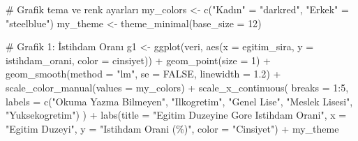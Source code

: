 \documentclass[
  11pt,
  a4paper,
  DIV=11,
  numbers=noendperiod]{scrartcl}
\newenvironment{Shaded}{\begin{snugshade}}{\end{snugshade}}
\newcommand{\AttributeTok}[1]{\textcolor[rgb]{0.40,0.45,0.13}{#1}}
\newcommand{\CommentTok}[1]{\textcolor[rgb]{0.37,0.37,0.37}{#1}}
\newcommand{\ConstantTok}[1]{\textcolor[rgb]{0.56,0.35,0.01}{#1}}
\newcommand{\DecValTok}[1]{\textcolor[rgb]{0.68,0.00,0.00}{#1}}
\newcommand{\FloatTok}[1]{\textcolor[rgb]{0.68,0.00,0.00}{#1}}
\newcommand{\FunctionTok}[1]{\textcolor[rgb]{0.28,0.35,0.67}{#1}}
\newcommand{\NormalTok}[1]{\textcolor[rgb]{0.00,0.23,0.31}{#1}}
\newcommand{\OtherTok}[1]{\textcolor[rgb]{0.00,0.23,0.31}{#1}}
\newcommand{\SpecialCharTok}[1]{\textcolor[rgb]{0.37,0.37,0.37}{#1}}
\newcommand{\StringTok}[1]{\textcolor[rgb]{0.13,0.47,0.30}{#1}}
\begin{document}
\begin{Shaded}
\begin{Highlighting}[]
\CommentTok{\# Grafik tema ve renk ayarları}
\NormalTok{my\_colors }\OtherTok{\textless{}{-}} \FunctionTok{c}\NormalTok{(}\StringTok{"Kadın"} \OtherTok{=} \StringTok{"darkred"}\NormalTok{, }\StringTok{"Erkek"} \OtherTok{=} \StringTok{"steelblue"}\NormalTok{)}
\NormalTok{my\_theme }\OtherTok{\textless{}{-}} \FunctionTok{theme\_minimal}\NormalTok{(}\AttributeTok{base\_size =} \DecValTok{12}\NormalTok{)}

\CommentTok{\# Grafik 1: İstihdam Oranı}
\NormalTok{g1 }\OtherTok{\textless{}{-}} \FunctionTok{ggplot}\NormalTok{(veri, }\FunctionTok{aes}\NormalTok{(}\AttributeTok{x =}\NormalTok{ egitim\_sira, }\AttributeTok{y =}\NormalTok{ istihdam\_orani, }\AttributeTok{color =}\NormalTok{ cinsiyet)) }\SpecialCharTok{+}
  \FunctionTok{geom\_point}\NormalTok{(}\AttributeTok{size =} \DecValTok{1}\NormalTok{) }\SpecialCharTok{+}
  \FunctionTok{geom\_smooth}\NormalTok{(}\AttributeTok{method =} \StringTok{"lm"}\NormalTok{, }\AttributeTok{se =} \ConstantTok{FALSE}\NormalTok{, }\AttributeTok{linewidth =} \FloatTok{1.2}\NormalTok{) }\SpecialCharTok{+}
  \FunctionTok{scale\_color\_manual}\NormalTok{(}\AttributeTok{values =}\NormalTok{ my\_colors) }\SpecialCharTok{+}
  \FunctionTok{scale\_x\_continuous}\NormalTok{(}
    \AttributeTok{breaks =} \DecValTok{1}\SpecialCharTok{:}\DecValTok{5}\NormalTok{,}
    \AttributeTok{labels =} \FunctionTok{c}\NormalTok{(}\StringTok{"Okuma Yazma Bilmeyen"}\NormalTok{, }\StringTok{"Ilkogretim"}\NormalTok{, }\StringTok{"Genel Lise"}\NormalTok{, }\StringTok{"Meslek Lisesi"}\NormalTok{, }\StringTok{"Yuksekogretim"}\NormalTok{)}
\NormalTok{  ) }\SpecialCharTok{+}
  \FunctionTok{labs}\NormalTok{(}\AttributeTok{title =} \StringTok{"Egitim Duzeyine Gore Istihdam Orani"}\NormalTok{,}
       \AttributeTok{x =} \StringTok{"Egitim Duzeyi"}\NormalTok{, }\AttributeTok{y =} \StringTok{"Istihdam Orani (\%)"}\NormalTok{, }\AttributeTok{color =} \StringTok{"Cinsiyet"}\NormalTok{) }\SpecialCharTok{+}
\NormalTok{  my\_theme}


\end{Highlighting}
\end{Shaded}
\end{document}
